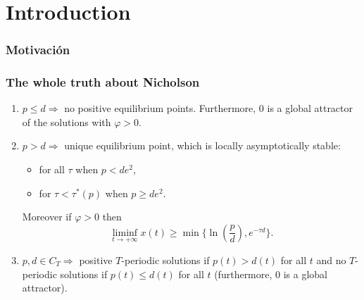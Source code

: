\documentclass[spanish]{beamer}
\title[\myTitle: \mySubtitle]{\bf {\myTitle}}
\author[\myName]{\myName}
\institute[\myFaculty]{}
\date[\myTime]{\myDepartment}
\def \le{\leqslant}
\def \ge{\geqslant}
\begin{document}
\begin{frame}
\titlepage
\end{frame}

\section{Introduction}
\begin{frame}
 \frametitle{Motivaci\'on}

\end{frame} 




\begin{frame} 
\frametitle{The whole truth about Nicholson}
\begin{enumerate}

    \item $p\le d \Longrightarrow$  no positive equilibrium points. 
    Furthermore,  $0$ is a global attractor of the solutions with $\varphi>0$. 
    \pause 
    \item $p>d \Longrightarrow$ unique equilibrium point, which is locally asymptotically stable: 
    
      \begin{itemize}
          \item  for all $\tau$ when $p<de^2$,
          \item  for $\tau<\tau^*(p)$ when $p\ge de^2$.
      \end{itemize}   Moreover if  $\varphi>0$  then $$\liminf_{t\to+\infty}x(t)\ge \min \{\ln \left(\frac pd\right), 
    e^{-\tau d}\}.$$
    \pause 
    \item $p, d \in C_T \Longrightarrow$   positive  $T$-periodic solutions if $p(t)>d(t)$ for all $t$ and no $T$-periodic solutions if $p(t)\le d(t)$ 
    for all $t$ (furthermore, $0$ is a global attractor). 
\end{enumerate}

\end{frame}
\end{document}
